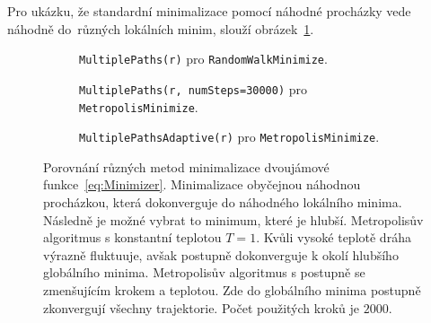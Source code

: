 \documentclass[a4paper,11pt,twoside]{article}
\def\code#1{\textnormal{\texttt{#1}}}
\begin{document}
        \begin{solution}
            Pro ukázku, že standardní minimalizace pomocí náhodné procházky vede náhodně do~různých lokálních minim, slouží obrázek~\ref{fig:MetropolisMinimizea}.

            \begin{figure}[!htbp]
                \centering
                \begin{subfigure}{0.49\linewidth}
                    \centering{}
                    \caption{\code{MultiplePaths(r)} pro \code{RandomWalkMinimize}.}
                    \label{fig:MetropolisMinimizea}
                \end{subfigure}
                \hfill
                \begin{subfigure}{0.49\linewidth}
                    \centering{}
                    \caption{\centering \code{MultiplePaths(r, numSteps=30000)} pro \code{MetropolisMinimize}.}
                    \label{fig:MetropolisMinimizeb}
                \end{subfigure}
                \hfill
                \begin{subfigure}{0.6\linewidth}
                    \centering{}
                    \caption{\code{MultiplePathsAdaptive(r)} pro \code{MetropolisMinimize}.}
                    \label{fig:MetropolisMinimizec}
                \end{subfigure}
                \hfill
    
                \caption{
                    \protect\small
                    Porovnání různých metod minimalizace dvoujámové funkce~\eqref{eq:Minimizer}.
                     Minimalizace obyčejnou náhodnou procházkou, která dokonverguje do náhodného lokálního minima.
                    Následně je možné vybrat to minimum, které je hlubší.
                     Metropolisův algoritmus s konstantní teplotou $T=1$.
                    Kvůli vysoké teplotě dráha výrazně fluktuuje, avšak postupně dokonverguje k okolí hlubšího globálního minima.
                     Metropolisův algoritmus s postupně se zmenšujícím krokem a teplotou.
                    Zde do globálního minima postupně zkonvergují všechny trajektorie.
                    Počet použitých kroků je $2000$.
                }	
                \label{fig:MetropolisMinimize}
            \end{figure}
            

\end{solution}
\end{document}
